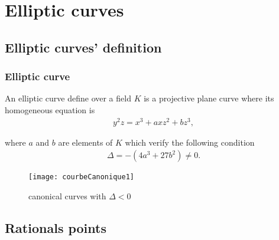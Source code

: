 \section{Elliptic curves}

\subsection{Elliptic curves' definition}

\begin{frame}[t]
    \frametitle{Elliptic curve}
    \begin{minipage}[t]{0.48\linewidth}
    \begin{definition}
        An elliptic curve define over a field $K$ is a projective plane curve where its
        homogeneous equation is
        \begin{align}
            \label{eq:ellipticCurve}
            y^2z = x^3 + axz^2 + b z^3
        ,\end{align}

        where $a$ and $b$ are elements of $K$ which verify the following condition
        \begin{align}
            \label{eq:delta}
        \Delta = - (4a^3 + 27 b^2) \neq 0
        .\end{align}
    \end{definition}
    \end{minipage}%
    \hfill%
    \begin{minipage}[t]{0.48\linewidth}
       \begin{figure}[h]
           \centering
           \texttt{[image: courbeCanonique1]}
           \caption{canonical curves with $\Delta < 0$}
           \label{fig:courbeCanonique1}
       \end{figure} 
    \end{minipage}
\end{frame}

\subsection{Rationals points}

